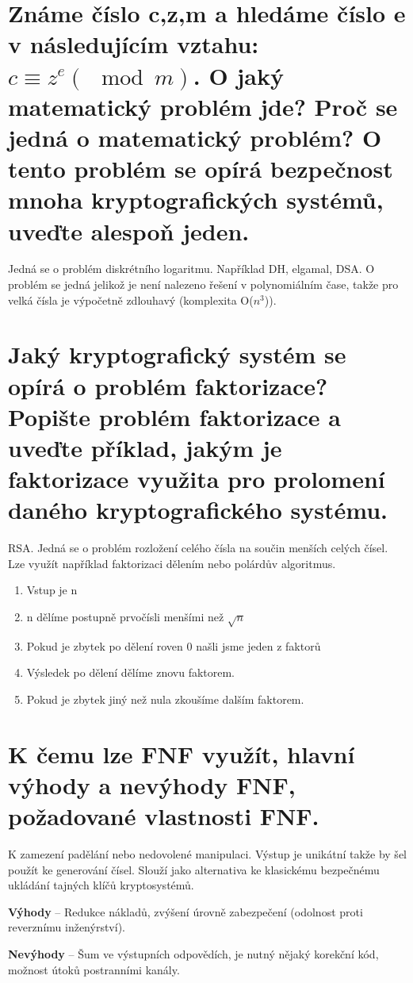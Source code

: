 \section{Známe číslo c,z,m a hledáme číslo e v následujícím vztahu: $c\equiv z^e (\mod m)$. O jaký matematický problém jde? Proč se jedná o matematický problém? O tento problém se opírá bezpečnost mnoha kryptografických systémů, uveďte alespoň jeden.}

Jedná se o problém diskrétního logaritmu. Například DH, elgamal, DSA. O problém se jedná jelikož je není nalezeno řešení v polynomiálním čase, takže pro velká čísla je výpočetně zdlouhavý (komplexita O($n^3$)).

\section{Jaký kryptografický systém se opírá o problém faktorizace? Popište problém faktorizace a uveďte příklad, jakým je faktorizace využita pro prolomení daného kryptografického systému.}

RSA. Jedná se o problém rozložení celého čísla na součin menších celých čísel. Lze využít například faktorizaci dělením nebo polárdův algoritmus.

\begin{enumerate}
    \item Vstup je n
    \item n dělíme postupně prvočísli menšími než $\sqrt{n}$
    \item Pokud je zbytek po dělení roven 0 našli jsme jeden z faktorů
    \item Výsledek po dělení dělíme znovu faktorem.
    \item Pokud je zbytek jiný než nula zkoušíme dalším faktorem.
\end{enumerate}

\section{K čemu lze FNF využít, hlavní výhody a nevýhody FNF, požadované vlastnosti FNF.}

K zamezení padělání nebo nedovolené manipulaci. Výstup je unikátní takže by šel použít ke generování čísel. Slouží jako alternativa ke klasickému bezpečnému ukládání tajných klíčů kryptosystémů.

\textbf{Výhody} -- Redukce nákladů, zvýšení úrovně zabezpečení (odolnost proti reverznímu inženýrství).

\textbf{Nevýhody} -- Šum ve výstupních odpovědích, je nutný nějaký korekční kód, možnost útoků postranními kanály.

